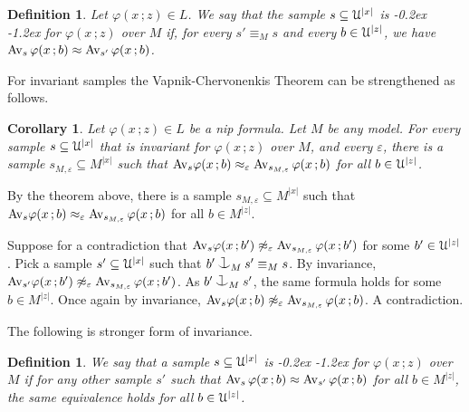 \documentclass[10pt,openany]{article}
\def\cnonfork{\mathbin{\raise1.8ex\rlap{\kern0.6ex\rule{0.6ex}{0.1ex}}
\rlap{\kern1.1ex\rule{0.1ex}{1.9ex}}\raise-0.3ex\hbox{$\smile$} } }
\def\U{\EuScript U}
\def\phi{\varphi}
\def\epsilon{\varepsilon}
\newcounter{thm}[section]
\theoremstyle{mio}
\newtheorem{corollary}[thm]{Corollary}
\newtheorem{definition}[thm]{Definition}
\theoremstyle{liscio}
\def\QED{\noindent\nolinebreak[4]\hspace{\stretch{1}}\rlap{\ \ $\Box$}\medskip}
\renewenvironment{proof}[1][Proof]%
{\begin{trivlist}\item[\hskip\labelsep {\bf #1}]}
{\QED\end{trivlist}}
\renewcommand*{\emph}[1]{%
   \kern-0.2ex 
   \smash{\tikz[baseline]
   \node[ rectangle, fill=emphcolor, rounded corners, 
          inner xsep=.3ex, inner ysep=.2ex, anchor=base,
          minimum height = 3ex
         ]{#1};
   }
   \kern-1.2ex 
}
\begin{document}
\begin{definition}
  Let  $\phi(x\,;z)\in L$.
  We say that the sample $s\subseteq\U^{|x|}$ is \emph{invariant\/} for $\phi(x\,;z)$ over $M$ if, for every $s'\equiv_Ms$ and every $b\in\U^{|z|}$, we have $\Av_s\,\phi(x\,;b)\approx\Av_{s'}\,\phi(x\,;b)$.\QED
\end{definition}

For invariant samples the Vapnik-Chervonenkis Theorem can be strengthened as follows.

\begin{corollary}
  Let  $\phi(x\,;z)\in L$ be a nip formula.
  Let $M$ be any model.
  For every sample $s\subseteq\U^{|x|}$ that is invariant for $\phi(x\,;z)$ over $M$, and every $\epsilon$, there is a sample $s_{M,\epsilon}\subseteq M^{|x|}$ such that $\Av_s\phi(x\,;b)\approx_\epsilon\Av_{s_{M,\epsilon}}\,\phi(x\,;b)$ for all $b\in\U^{|z|}$.
\end{corollary}

\begin{proof}
  By the theorem above, there is a sample $s_{M,\epsilon}\subseteq M^{|x|}$ such that $\Av_s\phi(x\,;b)\approx_\epsilon\Av_{s_{M,\epsilon}}\,\phi(x\,;b)$ for all $b\in M^{|z|}$.
  
  Suppose for a contradiction that $\Av_s\phi(x\,;b')\not\approx_\epsilon\Av_{s_{M,\epsilon}}\,\phi(x\,;b')$ for some $b'\in\U^{|z|}$.
  Pick a sample $s'\subseteq\U^{|x|}$ such that $b'\cnonfork_{M}s'\equiv_Ms$.
  By invariance, $\Av_{s'}\phi(x\,;b')\not\approx_\epsilon\Av_{s_{M,\epsilon}}\,\phi(x\,;b')$.
  As $b'\cnonfork_{M}s'$, the same formula holds for some $b\in M^{|z|}$.
  Once again by invariance, $\Av_s\phi(x\,;b)\not\approx_\epsilon\Av_{s_{M,\epsilon}}\,\phi(x\,;b)$.
  A contradiction.
\end{proof}

The following is stronger form of invariance.


\begin{definition}
  We say that a sample $s\subseteq\U^{|x|}$ is \emph{smooth\/} for $\phi(x\,;z)$ over $M$ if for any other sample $s'$ such that $\Av_s\,\phi(x\,;b)\approx\Av_{s'}\,\phi(x\,;b)$ for all $b\in M^{|z|}$, the same equivalence holds for all $b\in\U^{|z|}$.\QED
\end{definition}
\end{document}
